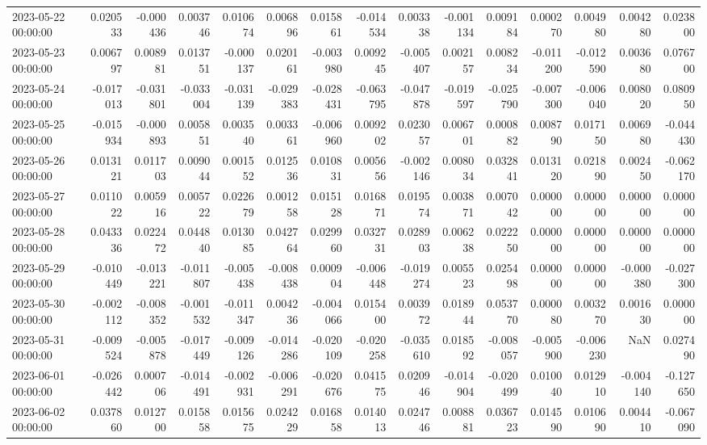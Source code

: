 \begin{tabular}{lrrrrrrrrrrrrrr}
2023-05-22 00:00:00 & 0.020533 & -0.000436 & 0.003746 & 0.010674 & 0.006896 & 0.015861 & -0.014534 & 0.003338 & -0.001134 & 0.009184 & 0.000270 & 0.004980 & 0.004280 & 0.023800 \\
2023-05-23 00:00:00 & 0.006797 & 0.008981 & 0.013751 & -0.000137 & 0.020161 & -0.003980 & 0.009245 & -0.005407 & 0.002157 & 0.008234 & -0.011200 & -0.012590 & 0.003680 & 0.076700 \\
2023-05-24 00:00:00 & -0.017013 & -0.031801 & -0.033004 & -0.031139 & -0.029383 & -0.028431 & -0.063795 & -0.047878 & -0.019597 & -0.025790 & -0.007300 & -0.006040 & 0.008020 & 0.080950 \\
2023-05-25 00:00:00 & -0.015934 & -0.000893 & 0.005851 & 0.003540 & 0.003361 & -0.006960 & 0.009202 & 0.023057 & 0.006701 & 0.000882 & 0.008790 & 0.017150 & 0.006980 & -0.044430 \\
2023-05-26 00:00:00 & 0.013121 & 0.011703 & 0.009044 & 0.001552 & 0.012536 & 0.010831 & 0.005656 & -0.002146 & 0.008034 & 0.032841 & 0.013120 & 0.021890 & 0.002450 & -0.062170 \\
2023-05-27 00:00:00 & 0.011022 & 0.005916 & 0.005722 & 0.022679 & 0.001258 & 0.015128 & 0.016871 & 0.019574 & 0.003871 & 0.007042 & 0.000000 & 0.000000 & 0.000000 & 0.000000 \\
2023-05-28 00:00:00 & 0.043336 & 0.022472 & 0.044840 & 0.013085 & 0.042764 & 0.029960 & 0.032731 & 0.028903 & 0.006238 & 0.022250 & 0.000000 & 0.000000 & 0.000000 & 0.000000 \\
2023-05-29 00:00:00 & -0.010449 & -0.013221 & -0.011807 & -0.005438 & -0.008438 & 0.000904 & -0.006448 & -0.019274 & 0.005523 & 0.025498 & 0.000000 & 0.000000 & -0.000380 & -0.027300 \\
2023-05-30 00:00:00 & -0.002112 & -0.008352 & -0.001532 & -0.011347 & 0.004236 & -0.004066 & 0.015400 & 0.003972 & 0.018944 & 0.053770 & 0.000080 & 0.003270 & 0.001630 & 0.000000 \\
2023-05-31 00:00:00 & -0.009524 & -0.005878 & -0.017449 & -0.009126 & -0.014286 & -0.020109 & -0.020258 & -0.035610 & 0.018592 & -0.008057 & -0.005900 & -0.006230 & NaN & 0.027490 \\
2023-06-01 00:00:00 & -0.026442 & 0.000706 & -0.014491 & -0.002931 & -0.006291 & -0.020676 & 0.041575 & 0.020946 & -0.014904 & -0.020499 & 0.010040 & 0.012910 & -0.004140 & -0.127650 \\
2023-06-02 00:00:00 & 0.037860 & 0.012700 & 0.015858 & 0.015675 & 0.024229 & 0.016858 & 0.014013 & 0.024746 & 0.008881 & 0.036723 & 0.014590 & 0.010690 & 0.004410 & -0.067090 \\

\end{tabular}
